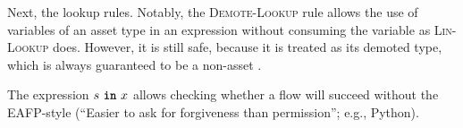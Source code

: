 \documentclass[dvipsnames, usenames, sigconf]{acmart}
\begin{document}
Next, the lookup rules.
Notably, the \textsc{Demote-Lookup} rule allows the use of variables of an asset type in an expression without consuming the variable as \textsc{Lin-Lookup} does.
However, it is still safe, because it is treated as its demoted type, which is always guaranteed to be a non-asset .

\begin{mathpar}



\end{mathpar}

The expression $s~\varin~x$ allows checking whether a flow will succeed without the EAFP-style (``Easier to ask for forgiveness than permission''; e.g., Python).
\begin{mathpar}
\end{mathpar}
\end{document}
